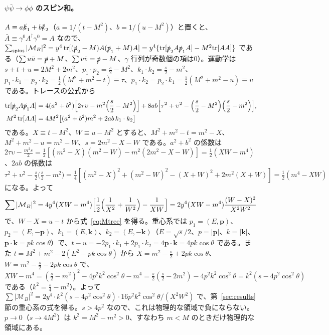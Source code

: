 \documentclass[a4paper,10pt]{ltjsarticle}
\begin{document}
\paragraph{$\psi\bar\psi\to\phi\phi$ のスピン和。}$A\equiv a\slashed k_1+b\slashed k_2$（$a=1/(t-M^2)$、$b=1/(u-M^2)$）と置くと、$\bar A\equiv\gamma^0A^\dagger\gamma^0=A$ なので、$\sum_{\mathrm{spins}}|\mathcal M_B|^2=y^4\,\mathrm{tr}[(\slashed p_2-M)A(\slashed p_1+M)A]=y^4\{\mathrm{tr}[\slashed p_2A\slashed p_1A]-M^2\mathrm{tr}[AA]\}$ である（$\sum u\bar u=\slashed p+M$、$\sum v\bar v=\slashed p-M$、$\gamma$ 行列が奇数個の項は0）。運動学は $s+t+u=2M^2+2m^2$、$p_1\cdot p_2=\frac{s}{2}-M^2$、$k_1\cdot k_2=\frac s2-m^2$、$p_1\cdot k_1=p_2\cdot k_2=\frac12(M^2+m^2-t)\equiv\tau$、$p_1\cdot k_2=p_2\cdot k_1=\frac12(M^2+m^2-u)\equiv\upsilon$ である。トレースの公式から
\begin{equation*}
\begin{aligned}
\mathrm{tr}[\slashed p_2A\slashed p_1A]&=4(a^2+b^2)\Bigl[2\tau\upsilon-m^2\Bigl(\frac s2-M^2\Bigr)\Bigr]+8ab\Bigl[\tau^2+\upsilon^2-\Bigl(\frac s2-M^2\Bigr)\Bigl(\frac s2-m^2\Bigr)\Bigr],\\
M^2\,\mathrm{tr}[AA]&=4M^2\bigl[(a^2+b^2)m^2+2ab\,k_1\cdot k_2\bigr]
\end{aligned}
\end{equation*}
である。$X\equiv t-M^2$、$W\equiv u-M^2$ とすると、$M^2+m^2-t=m^2-X$、$M^2+m^2-u=m^2-W$、$s=2m^2-X-W$ である。$a^2+b^2$ の係数は $2\tau\upsilon-\frac{m^2s}{2}=\frac12[(m^2-X)(m^2-W)-m^2(2m^2-X-W)]=\frac12(XW-m^4)$、$2ab$ の係数は $\tau^2+\upsilon^2-\frac{s}{2}\bigl(\frac s2-m^2\bigr)=\frac14[(m^2-X)^2+(m^2-W)^2-(X+W)^2+2m^2(X+W)]=\frac12(m^4-XW)$ になる。よって
\begin{equation*}
\sum|\mathcal M_B|^2=4y^4(XW-m^4)\Bigl[\frac12\Bigl(\frac1{X^2}+\frac1{W^2}\Bigr)-\frac{1}{XW}\Bigr]=2y^4(XW-m^4)\frac{(W-X)^2}{X^2W^2}
\end{equation*}
で、$W-X=u-t$ から式~\eqref{eq:Mtree} を得る。重心系では $p_1=(E,\boldsymbol p)$、$p_2=(E,-\boldsymbol p)$、$k_1=(E,\boldsymbol k)$、$k_2=(E,-\boldsymbol k)$（$E=\sqrt s/2$、$p=|\boldsymbol p|$、$k=|\boldsymbol k|$、$\boldsymbol p\cdot\boldsymbol k=pk\cos\theta$）で、$t-u=-2p_1\cdot k_1+2p_1\cdot k_2=4\boldsymbol p\cdot\boldsymbol k=4pk\cos\theta$ である。また $t=M^2+m^2-2(E^2-pk\cos\theta)$ から $X=m^2-\frac s2+2pk\cos\theta$、$W=m^2-\frac s2-2pk\cos\theta$ で、$XW-m^4=(\frac s2-m^2)^2-4p^2k^2\cos^2\theta-m^4=\frac s2(\frac s2-2m^2)-4p^2k^2\cos^2\theta=k^2(s-4p^2\cos^2\theta)$ である（$k^2=\frac s4-m^2$）。よって $\sum|\mathcal M_B|^2=2y^4\cdot k^2(s-4p^2\cos^2\theta)\cdot16p^2k^2\cos^2\theta/(X^2W^2)$ で、第~\ref{sec:results} 節の重心系の式を得る。$s>4p^2$ なので、これは物理的な領域で負にならない。$p\to0$（$s\to4M^2$）は $k^2=M^2-m^2>0$、すなわち $m<M$ のときだけ物理的な領域にある。
\end{document}
